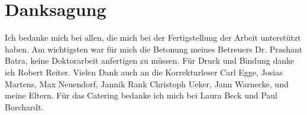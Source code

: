 

\chapter*{Danksagung}

Ich bedanke mich bei allen, die mich bei der Fertigstellung der Arbeit unterstützt haben. Am wichtigsten war für mich die Betonung meines Betreuers Dr. Prashant Batra, keine Doktorarbeit anfertigen zu müssen.
Für Druck und Bindung danke ich Robert Reiter.
Vielen Dank auch an die Korrekturleser 
Carl Egge,
Josias Martens,
Max Neuendorf,
Jannik Rank
Christoph Ueker,
Jann Warnecke,
und meine Eltern. 
Für das Catering bedanke ich mich bei Laura Beck und Paul Borchardt.







